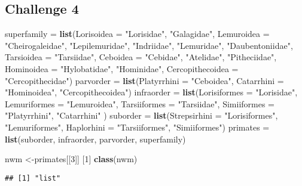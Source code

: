 \documentclass[]{article}
\newenvironment{Shaded}{\begin{snugshade}}{\end{snugshade}}
\newcommand{\DataTypeTok}[1]{\textcolor[rgb]{0.13,0.29,0.53}{#1}}
\newcommand{\DecValTok}[1]{\textcolor[rgb]{0.00,0.00,0.81}{#1}}
\newcommand{\KeywordTok}[1]{\textcolor[rgb]{0.13,0.29,0.53}{\textbf{#1}}}
\newcommand{\NormalTok}[1]{#1}
\newcommand{\StringTok}[1]{\textcolor[rgb]{0.31,0.60,0.02}{#1}}
\begin{document}
\hypertarget{challenge-4}{%
\subsection{Challenge 4}\label{challenge-4}}

\begin{Shaded}
\begin{Highlighting}[]
\NormalTok{superfamily =}\StringTok{ }\KeywordTok{list}\NormalTok{(}\DataTypeTok{Lorisoidea =} \StringTok{"Lorisidae"}\NormalTok{, }\StringTok{"Galagidae"}\NormalTok{, }\DataTypeTok{Lemuroidea =} \StringTok{"Cheirogaleidae"}\NormalTok{, }\StringTok{"Lepilemuridae"}\NormalTok{, }\StringTok{"Indriidae"}\NormalTok{, }\StringTok{"Lemuridae"}\NormalTok{, }\StringTok{"Daubentoniidae"}\NormalTok{, }\DataTypeTok{Tarsioidea =} \StringTok{"Tarsiidae"}\NormalTok{, }\DataTypeTok{Ceboidea =} \StringTok{"Cebidae"}\NormalTok{, }\StringTok{"Atelidae"}\NormalTok{, }\StringTok{"Pitheciidae"}\NormalTok{, }\DataTypeTok{Hominoidea =} \StringTok{"Hylobatidae"}\NormalTok{, }\StringTok{"Hominidae"}\NormalTok{, }\DataTypeTok{Cercopithecoidea =} \StringTok{"Cercopithecidae"}\NormalTok{)}
\NormalTok{parvorder =}\StringTok{ }\KeywordTok{list}\NormalTok{(}\DataTypeTok{Platyrrhini =} \StringTok{"Ceboidea"}\NormalTok{, }\DataTypeTok{Catarrhini =} \StringTok{"Hominoidea"}\NormalTok{, }\StringTok{"Cercopithecoidea"}\NormalTok{)}
\NormalTok{infraorder =}\StringTok{ }\KeywordTok{list}\NormalTok{(}\DataTypeTok{Lorisiformes =} \StringTok{"Lorisidae"}\NormalTok{, }\DataTypeTok{Lemuriformes =} \StringTok{"Lemuroidea"}\NormalTok{, }\DataTypeTok{Tarsiiformes =} \StringTok{"Tarsiidae"}\NormalTok{, }\DataTypeTok{Simiiformes =} \StringTok{"Platyrrhini"}\NormalTok{, }\StringTok{"Catarrhini"}\NormalTok{ )}
\NormalTok{suborder =}\StringTok{ }\KeywordTok{list}\NormalTok{(}\DataTypeTok{Strepsirhini =} \StringTok{"Lorisiformes"}\NormalTok{, }\StringTok{"Lemuriformes"}\NormalTok{, }\DataTypeTok{Haplorhini =} \StringTok{"Tarsiiformes"}\NormalTok{, }\StringTok{"Simiiformes"}\NormalTok{)}
\NormalTok{primates =}\StringTok{ }\KeywordTok{list}\NormalTok{(suborder, infraorder, parvorder, superfamily)}

\NormalTok{nwm <-primates[[}\DecValTok{3}\NormalTok{]] [}\DecValTok{1}\NormalTok{]  }
\KeywordTok{class}\NormalTok{(nwm)  }
\end{Highlighting}
\end{Shaded}

\begin{verbatim}
## [1] "list"
\end{verbatim}
\end{document}
